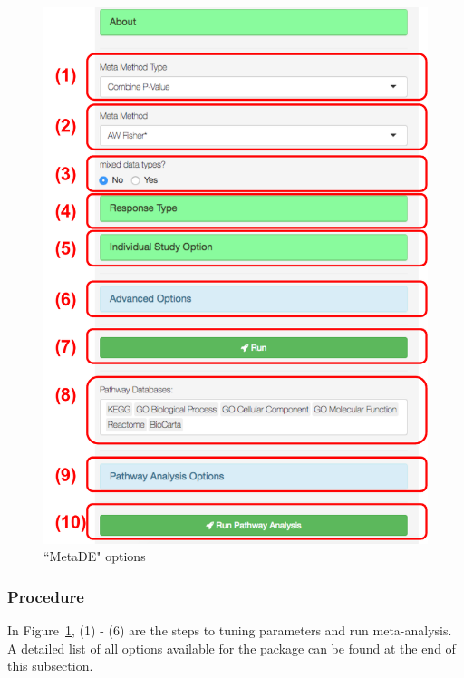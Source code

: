 \begin{figure}[H]
\begin{center}
\includegraphics[scale=0.5]{./figure/metaDE/metaDEoption.pdf}
\caption{``MetaDE" options}
\label{fig:MetaDEoption}
\end{center}
\end{figure}

\subsubsection{Procedure}
In Figure~\ref{fig:MetaDEoption},
{\color{red} (1) - (6)} are the steps to tuning parameters and run meta-analysis.
A detailed list of all options available for the package can be found at the end of this subsection. 

